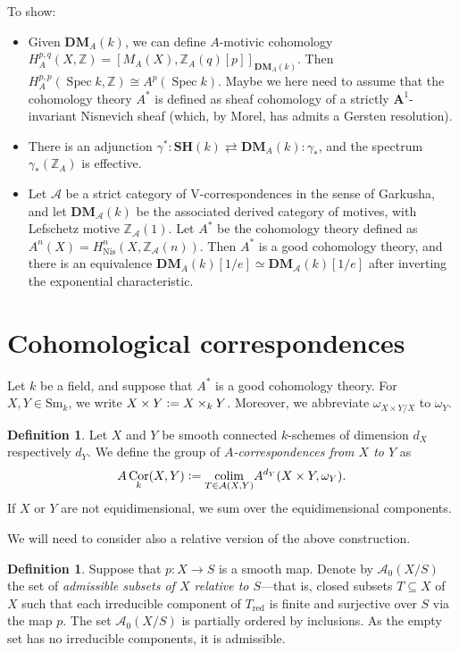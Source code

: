 \documentclass[a4paper, oneside, english,reqno]{amsart}
\theoremstyle{plain}
\theoremstyle{definition}
\newtheorem{definition}[theorem]{Definition}
\theoremstyle{remark}
\newcommand{\defeq}{\vcentcolon=}
\newcommand{\Nis}{\mathrm{Nis}}
\newcommand{\A}{\mathbf{A}}
\newcommand{\calA}{\mathcal{A}}
\newcommand{\DM}{\mathbf{DM}}
\newcommand{\Sm}{\mathrm{Sm}}
\newcommand{\SH}{\mathbf{SH}}
\newcommand{\red}{\mathrm{red}}
\newcommand{\DMA}{{\mathbf{DM}}_A}
\DeclareMathOperator{\Spec}{Spec}
\DeclareMathOperator{\Cor}{Cor}
\DeclareMathOperator{\colim}{colim}
\begin{document}
To show:
\begin{itemize}
\item Given $\DMA(k)$, we can define $A$-motivic cohomology $H_A^{p,q}(X,\mathbb{Z})=[M_A(X),\mathbb{Z}_A(q)[p]]_{\DMA(k)}$. Then $H_A^{p,p}(\Spec k,\mathbb{Z})\cong A^p(\Spec k)$. Maybe we here need to assume that the cohomology theory $A^*$ is defined as sheaf cohomology of a strictly $\A^1$-invariant Nisnevich sheaf (which, by Morel, has admits a Gersten resolution).
\item There is an adjunction $\gamma^*: \SH(k)\rightleftarrows \DMA(k):\gamma_*$, and the spectrum $\gamma_*(\mathbb{Z}_A)$ is effective.
\item Let $\mathscr{A}$ be a strict category of V-correspondences in the sense of Garkusha, and let $\DM_{\mathscr{A}}(k)$ be the associated derived category of motives, with Lefschetz motive $\mathbb{Z}_{\mathscr{A}}(1)$. Let $A^*$ be the cohomology theory defined as $A^n(X)=H^n_{\Nis}(X,\mathbb{Z}_{\mathscr{A}}(n))$. Then $A^*$ is a good cohomology theory, and there is an equivalence $\DMA(k)[1/e]\simeq\DM_{\mathscr{A}}(k)[1/e]$ after inverting the exponential characteristic.
\end{itemize}

\section{Cohomological correspondences}

Let $k$ be a field, and suppose that $A^*$ is a good cohomology theory. For $X,Y\in\Sm_k$, we write $X\times Y\defeq X\times_k Y$. Moreover, we abbreviate $\omega_{X\times Y/X}$ to $\omega_Y$.

\begin{definition}
Let $X$ and $Y$ be smooth connected $k$-schemes of dimension $d_X$ respectively $d_Y$. We define the group of \emph{$A$-correspondences from $X$ to $Y$} as
\[
A\Cor_k(X,Y)\defeq\underset{T\in\calA(X,Y)}{\colim}A^{d_Y}(X\times Y,\omega_{Y}).
\]
If $X$ or $Y$ are not equidimensional, we sum over the equidimensional components.
\end{definition}

We will need to consider also a relative version of the above construction.

\begin{definition}
Suppose that $p\colon X\to S$ is a smooth map. Denote by $\calA_0(X/S)$ the set of \emph{admissible subsets of $X$ relative to $S$}---that is, closed subsets $T\subseteq X$ of $X$ such that each irreducible component of $T_\red$ is finite and surjective over $S$ via the map $p$. The set $\calA_0(X/S)$ is partially ordered by inclusions. As the empty set has no irreducible components, it is admissible.
\end{definition}
\end{document}
